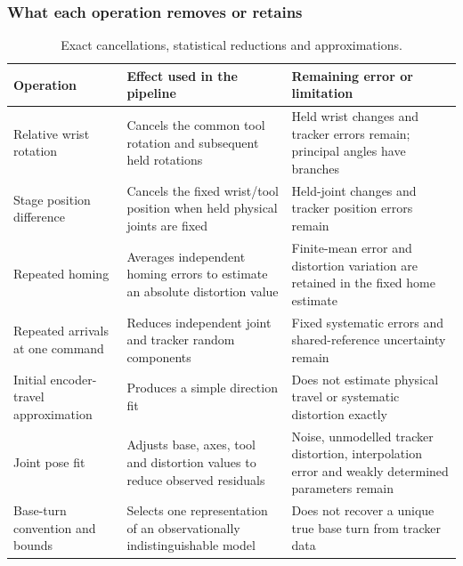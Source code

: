 \documentclass[../main.tex]{subfiles}
\begin{document}
\subsubsection{What each operation removes or retains}
\begin{table}[H]
\centering\small
\begin{tabular}{@{}>{\raggedright\arraybackslash}p{}>{\raggedright\arraybackslash}p{}>{\raggedright\arraybackslash}p{}@{}}
\toprule
Operation & Effect used in the pipeline & Remaining error or limitation \\\midrule
Relative wrist rotation & Cancels the common tool rotation and subsequent held rotations & Held wrist changes and tracker errors remain; principal angles have branches \\
Stage position difference & Cancels the fixed wrist/tool position when held physical joints are fixed & Held-joint changes and tracker position errors remain \\
Repeated homing & Averages independent homing errors to estimate an absolute distortion value & Finite-mean error and distortion variation are retained in the fixed home estimate \\
Repeated arrivals at one command & Reduces independent joint and tracker random components & Fixed systematic errors and shared-reference uncertainty remain \\
Initial encoder-travel approximation & Produces a simple direction fit & Does not estimate physical travel or systematic distortion exactly \\
Joint pose fit & Adjusts base, axes, tool and distortion values to reduce observed residuals & Noise, unmodelled tracker distortion, interpolation error and weakly determined parameters remain \\
Base-turn convention and bounds & Selects one representation of an observationally indistinguishable model & Does not recover a unique true base turn from tracker data \\
\bottomrule
\end{tabular}
\caption{Exact cancellations, statistical reductions and approximations.}
\end{table}
\end{document}
